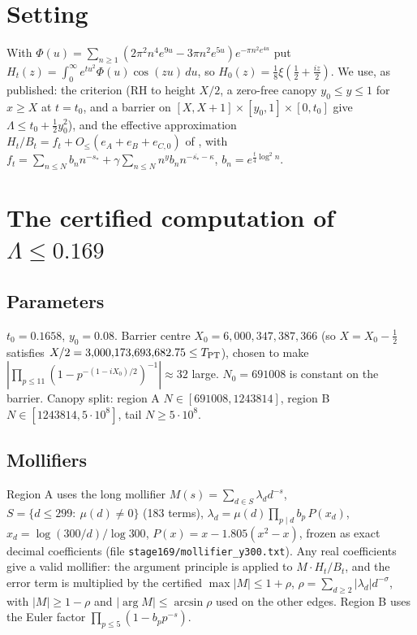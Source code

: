 \documentclass[11pt]{amsart}
\begin{document}
\section{Setting}
With $\Phi(u)=\sum_{n\ge1}(2\pi^2n^4e^{9u}-3\pi n^2e^{5u})e^{-\pi n^2e^{4u}}$ put $H_t(z)=\int_0^\infty e^{tu^2}\Phi(u)\cos(zu)\,du$, so $H_0(z)=\tfrac18\xi(\tfrac12+\tfrac{iz}2)$.
We use, as published: the criterion \cite[Thm.~1.2]{pm15} (RH to height $X/2$, a zero-free canopy $y_0\le y\le1$ for
$x\ge X$ at $t=t_0$, and a barrier on $[X,X+1]\times[y_0,1]\times[0,t_0]$ give $\Lambda\le t_0+\frac12y_0^2$), and the
effective approximation $H_t/B_t=f_t+O_\le(e_A+e_B+e_{C,0})$ of \cite[Thm.~1.3]{pm15}, with
$f_t=\sum_{n\le N}b_n n^{-s_*}+\gamma\sum_{n\le N}n^{y}b_n n^{-\overline{s_*}-\kappa}$, $b_n=e^{\frac t4\log^2n}$.

\section{The certified computation of $\Lambda\le0.169$}\label{sec:main}
\subsection*{Parameters}
$t_0=0.1658$, $y_0=0.08$. Barrier centre $X_0=6{,}000{,}347{,}387{,}366$ (so $X=X_0-\tfrac12$ satisfies
$X/2=3{,}000{,}173{,}693{,}682.75\le T_{\rm PT}$), chosen to make $|\prod_{p\le11}(1-p^{-(1-iX_0)/2})^{-1}|\approx32$ large.
$N_0=691008$ is constant on the barrier. Canopy split: region A $N\in[691008,1243814]$, region B $N\in[1243814,5\cdot10^8]$, tail $N\ge5\cdot10^8$.

\subsection*{Mollifiers}
Region A uses the long mollifier $M(s)=\sum_{d\in S}\lambda_d d^{-s}$, $S=\{d\le299:\ \mu(d)\ne0\}$ (183 terms),
$\lambda_d=\mu(d)\prod_{p\mid d}b_p\,P(x_d)$, $x_d=\log(300/d)/\log300$, $P(x)=x-1.805(x^2-x)$, frozen as exact
decimal coefficients (file \texttt{stage169/mollifier\_y300.txt}). Any real coefficients give a valid mollifier: the
argument principle is applied to $M\cdot H_t/B_t$, and the error term is multiplied by the certified
$\max|M|\le1+\rho$, $\rho=\sum_{d\ge2}|\lambda_d|d^{-\sigma}$, with $|M|\ge1-\rho$ and $|\arg M|\le\arcsin\rho$ used on the
other edges. Region B uses the Euler factor $\prod_{p\le5}(1-b_pp^{-s})$.
\end{document}
